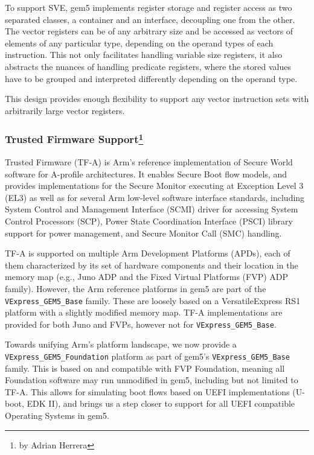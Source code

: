 To support SVE, gem5 implements register storage and register access
as two separated classes, a container and an interface, decoupling one from the
other. The vector registers can be of any arbitrary size and be accessed as
vectors of elements of any particular type, depending on the operand types of
each instruction. This not only facilitates handling variable size registers,
it also abstracts the nuances of handling predicate registers, where the stored
values have to be grouped and interpreted differently depending on the operand
type.

This design provides enough flexibility to support any vector instruction sets
with arbitrarily large vector registers.

\subsubsection[Trusted Firmware Support]{Trusted Firmware Support\footnote{by Adrian Herrera}}

Trusted Firmware (TF-A) is Arm's reference implementation of Secure World software for A-profile architectures.
It enables Secure Boot flow models, and provides implementations for the Secure Monitor executing at Exception Level 3 (EL3) as well as for several Arm low-level software interface standards, including System Control and Management Interface (SCMI) driver for accessing System Control Processors (SCP), Power State Coordination Interface (PSCI) library support for power management, and Secure Monitor Call (SMC) handling.

TF-A is supported on multiple Arm Development Platforms (APDs), each of them characterized by its set of hardware components and their location in the memory map (e.g., Juno ADP and the Fixed Virtual Platforms (FVP) ADP family).
However, the Arm reference platforms in gem5 are part of the \verb|VExpress_GEM5_Base| family.
These are loosely based on a Versatile\texttrademark Express RS1 platform with a slightly modified memory map. TF-A implementations are provided for both Juno and FVPs, however not for \verb|VExpress_GEM5_Base|.

Towards unifying Arm's platform landscape, we now provide a \verb|VExpress_GEM5_Foundation| platform as part of gem5's \verb|VExpress_GEM5_Base| family.
This is based on and compatible with FVP Foundation, meaning all Foundation software may run unmodified in gem5, including but not limited to TF-A.
This allows for simulating boot flows based on UEFI implementations (U-boot, EDK II), and brings us a step closer to support for all UEFI compatible Operating Systems in gem5.
